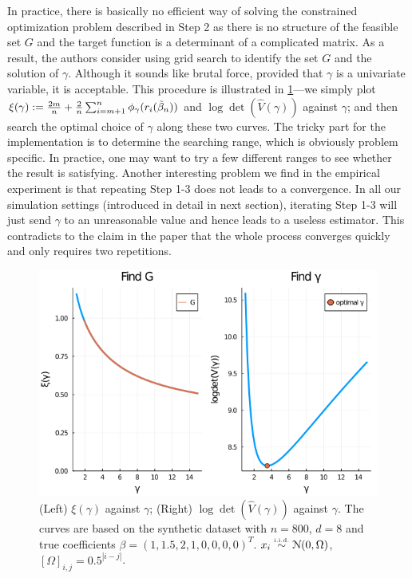 In practice, there is basically no efficient way of solving the constrained optimization problem described in Step 2 as there is no structure of the feasible set $G$ and the target function is a determinant of a complicated matrix. As a result, the authors consider using grid search to identify the set $G$ and the solution of $\gamma$.  Although it sounds like brutal force, provided that $\gamma$ is a univariate variable, it is acceptable.  This procedure is illustrated in \cref{fig:gamma}---we simply plot $\xi(\gamma):= \frac{2m}{n} + \frac{2}{n}\sum_{ i =m+ 1}^n \phi_\gamma(r_i(\tilde \beta_n))$ and $\log \det (\hat V (\gamma))$  against $\gamma$; and then search the optimal choice of $\gamma$ along these two curves.    The tricky part for the implementation is to determine the searching range, which is obviously problem specific. In practice, one  may want to try a few different ranges to see whether the result is satisfying. Another interesting problem we find in the empirical experiment is that repeating Step 1-3 does not leads to a convergence. In all our simulation settings (introduced in detail in next section), iterating Step 1-3 will just send $\gamma$ to an unreasonable value and hence leads to a useless estimator. This contradicts to the claim in the paper that the whole process converges quickly and only requires two repetitions. 



\begin{figure}[t!]
    \centering
    \includegraphics[width = 0.8\linewidth]{figures/gamma_plot.png}
    \caption{(Left) $\xi(\gamma)$ against $\gamma$; (Right) $\log \det (\hat V (\gamma)) $   against $\gamma$. The curves are based on the synthetic dataset with $n = 800$, $d = 8$ and true coefficients $\beta  =(1, 1.5, 2, 1, 0,0,0,0)^T$. $x_i\distiid \distNorm(0, \Omega)$, $[\Omega]_{i,j} = 0.5^{|i-j|}$. } \label{fig:gamma}
\end{figure}



